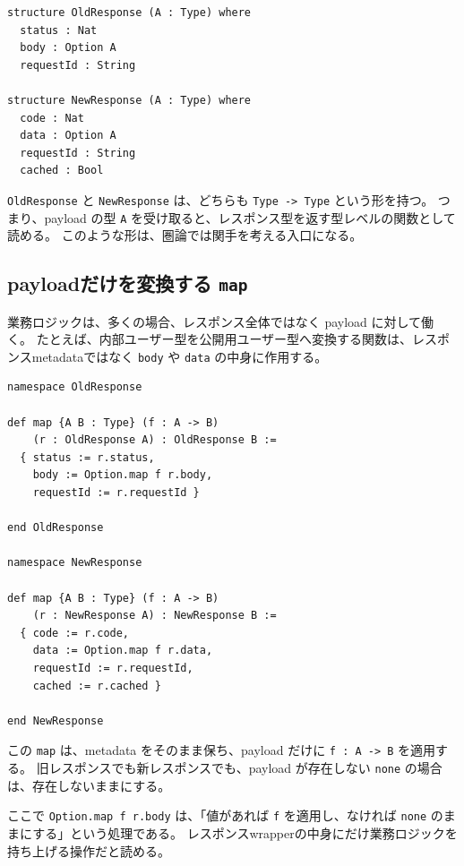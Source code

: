 \begin{listing}[htbp]
\begin{verbatim}
structure OldResponse (A : Type) where
  status : Nat
  body : Option A
  requestId : String

structure NewResponse (A : Type) where
  code : Nat
  data : Option A
  requestId : String
  cached : Bool
\end{verbatim}
\caption{旧レスポンスと新レスポンスの最小モデル}
\label{lst:ch25-response-types}
\end{listing}

\texttt{OldResponse} と \texttt{NewResponse} は、どちらも \texttt{Type -> Type} という形を持つ。
つまり、payload の型 \texttt{A} を受け取ると、レスポンス型を返す型レベルの関数として読める。
このような形は、圏論では関手を考える入口になる。

\subsection{payloadだけを変換する \texttt{map}}

業務ロジックは、多くの場合、レスポンス全体ではなく payload に対して働く。
たとえば、内部ユーザー型を公開用ユーザー型へ変換する関数は、レスポンスmetadataではなく \texttt{body} や \texttt{data} の中身に作用する。

\begin{listing}[htbp]
\begin{verbatim}
namespace OldResponse

def map {A B : Type} (f : A -> B)
    (r : OldResponse A) : OldResponse B :=
  { status := r.status,
    body := Option.map f r.body,
    requestId := r.requestId }

end OldResponse

namespace NewResponse

def map {A B : Type} (f : A -> B)
    (r : NewResponse A) : NewResponse B :=
  { code := r.code,
    data := Option.map f r.data,
    requestId := r.requestId,
    cached := r.cached }

end NewResponse
\end{verbatim}
\caption{payloadだけを変換するmap}
\label{lst:ch25-response-map}
\end{listing}

この \texttt{map} は、metadata をそのまま保ち、payload だけに \texttt{f : A -> B} を適用する。
旧レスポンスでも新レスポンスでも、payload が存在しない \texttt{none} の場合は、存在しないままにする。

\begin{leanbox}
ここで \texttt{Option.map f r.body} は、「値があれば \texttt{f} を適用し、なければ \texttt{none} のままにする」という処理である。
レスポンスwrapperの中身にだけ業務ロジックを持ち上げる操作だと読める。
\end{leanbox}


